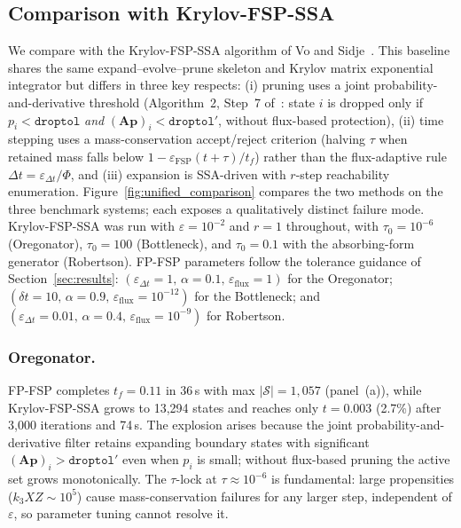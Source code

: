 \documentclass[onefignum,onetabnum]{siamart171218}
\begin{document}
\subsection{Comparison with Krylov-FSP-SSA}
\label{sec:comparison}

We compare with the Krylov-FSP-SSA algorithm of Vo and Sidje~\cite{Sidje2015}. This baseline shares the same expand--evolve--prune skeleton and Krylov matrix exponential integrator but differs in three key respects: (i) pruning uses a joint probability-and-derivative threshold (Algorithm~2, Step~7 of~\cite{Vo2017}: state $i$ is dropped only if $p_i < \texttt{droptol}$ \emph{and} $(\mathbf{A}\boldsymbol{p})_i < \texttt{droptol}'$, without flux-based protection), (ii) time stepping uses a mass-conservation accept/reject criterion (halving $\tau$ when retained mass falls below $1 - \varepsilon_{\mathrm{FSP}}(t+\tau)/t_f$) rather than the flux-adaptive rule $\Delta t = \varepsilon_{\Delta t}/\Phi$, and (iii) expansion is SSA-driven with $r$-step reachability enumeration. Figure~\ref{fig:unified_comparison} compares the two methods on the three benchmark systems; each exposes a qualitatively distinct failure mode. Krylov-FSP-SSA was run with $\varepsilon{=}10^{-2}$ and $r{=}1$ throughout, with $\tau_0{=}10^{-6}$ (Oregonator), $\tau_0{=}100$ (Bottleneck), and $\tau_0{=}0.1$ with the absorbing-form generator (Robertson). FP-FSP parameters follow the tolerance guidance of Section~\ref{sec:results}: $(\varepsilon_{\Delta t}{=}1,\,\alpha{=}0.1,\,\varepsilon_{\mathrm{flux}}{=}1)$ for the Oregonator; $(\delta t{=}10,\,\alpha{=}0.9,\,\varepsilon_{\mathrm{flux}}{=}10^{-12})$ for the Bottleneck; and $(\varepsilon_{\Delta t}{=}0.01,\,\alpha{=}0.4,\,\varepsilon_{\mathrm{flux}}{=}10^{-9})$ for Robertson.

\subsubsection{Oregonator.}
FP-FSP completes $t_f = 0.11$ in 36\,s with max $|\mathcal{S}| = 1{,}057$ (panel~(a)), while Krylov-FSP-SSA grows to 13{,}294 states and reaches only $t = 0.003$ (2.7\%) after 3{,}000 iterations and 74\,s. The explosion arises because the joint probability-and-derivative filter retains expanding boundary states with significant $(\mathbf{A}\boldsymbol{p})_i > \texttt{droptol}'$ even when $p_i$ is small; without flux-based pruning the active set grows monotonically. The $\tau$-lock at $\tau \approx 10^{-6}$ is fundamental: large propensities ($k_3 XZ \sim 10^5$) cause mass-conservation failures for any larger step, independent of $\varepsilon$, so parameter tuning cannot resolve it.
\end{document}

